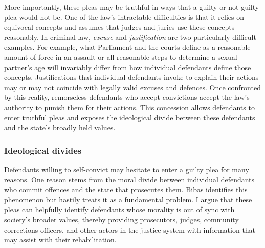 More importantly, these pleas may be truthful in ways that a guilty or not guilty plea would not be. One of the law's intractable difficulties is that it relies on equivocal concepts and assumes that judges and juries use these concepts reasonably. In criminal law, \textit{excuse} and \textit{justification} are two particularly difficult examples. For example, what Parliament and the courts define as a reasonable amount of force in an assault or all reasonable steps to determine a sexual partner's age will invariably differ from how individual defendants define those concepts. Justifications that individual defendants invoke to explain their actions may or may not coincide with legally valid excuses and defences. Once confronted by this reality, remorseless defendants who accept convictions accept the law's authority to punish them for their actions. This concession allows defendants to enter truthful pleas and exposes the ideological divide between these defendants and the state's broadly held values.

\subsubsection{Ideological divides}

Defendants willing to self-convict may hesitate to enter a guilty plea for many reasons. One reason stems from the moral divide between individual defendants who commit offences and the state that prosecutes them. Bibas identifies this phenomenon but hastily treats it as a fundamental problem. I argue that these pleas can helpfully identify defendants whose morality is out of sync with society's broader values, thereby providing prosecutors, judges, community corrections officers, and other actors in the justice system with information that may assist with their rehabilitation.


